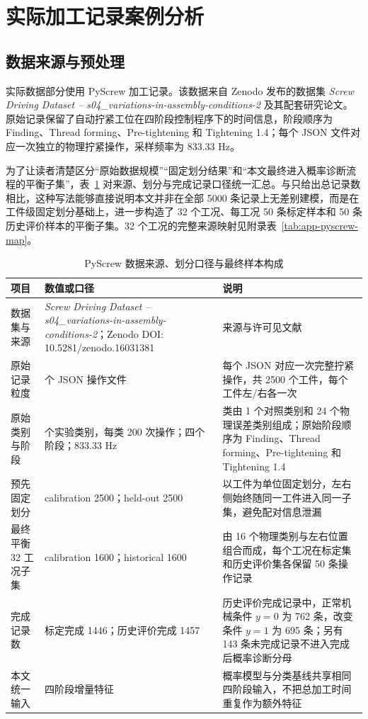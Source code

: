 \documentclass[master,fontset=ubuntu]{shnuthesis}
\theoremstyle{definition}
\begin{document}
\section{实际加工记录案例分析}

\subsection{数据来源与预处理}

实际数据部分使用 PyScrew 加工记录。该数据来自 Zenodo 发布的数据集 \textit{Screw Driving Dataset -- s04\_variations-in-assembly-conditions-2} 及其配套研究论文\cite{WestDeuse2025PyScrewDataset,WestDeuse2024HICSS}。原始记录保留了自动拧紧工位在四阶段控制程序下的时间信息，阶段顺序为 Finding、Thread forming、Pre-tightening 和 Tightening 1.4；每个 JSON 文件对应一次独立的物理拧紧操作，采样频率为 833.33 Hz。

为了让读者清楚区分“原始数据规模”“固定划分结果”和“本文最终进入概率诊断流程的平衡子集”，表~\ref{tab:chap6-pyscrew-data} 对来源、划分与完成记录口径统一汇总。与只给出总记录数相比，这种写法能够直接说明本文并非在全部 5000 条记录上无差别建模，而是在工件级固定划分基础上，进一步构造了 32 个工况、每工况 50 条标定样本和 50 条历史评价样本的平衡子集。32 个工况的完整来源映射见附录表~\ref{tab:app-pyscrew-map}。

\begin{table}[htbp]
\centering
\caption{PyScrew 数据来源、划分口径与最终样本构成}
\label{tab:chap6-pyscrew-data}
\renewcommand{\arraystretch}{1.18}
\small
\setlength{\tabcolsep}{5pt}
\begin{tabularx}{\textwidth}{>{\raggedright\arraybackslash}p{2.45cm}>{\raggedright\arraybackslash}p{4.65cm}>{\raggedright\arraybackslash}X}
\hline
项目 & 数值或口径 & 说明\\
\hline
数据集与来源 & \textit{Screw Driving Dataset -- s04\_variations-in-assembly-conditions-2}；Zenodo DOI: 10.5281/zenodo.16031381 & 来源与许可见文献\cite{WestDeuse2025PyScrewDataset,WestDeuse2024HICSS}\\
原始记录粒度 & 5000 个 JSON 操作文件 & 每个 JSON 对应一次完整拧紧操作，共 2500 个工件，每个工件左/右各一次\\
原始类别与阶段 & 25 个实验类别，每类 200 次操作；四个阶段；833.33 Hz & 25 类由 1 个对照类别和 24 个物理误差类别组成；原始阶段顺序为 Finding、Thread forming、Pre-tightening 和 Tightening 1.4\\
预先固定划分 & calibration 2500；held-out 2500 & 以工件为单位固定划分，左右侧始终随同一工件进入同一子集，避免配对信息泄漏\\
最终平衡 32 工况子集 & calibration 1600；historical 1600 & 由 16 个物理类别与左右位置组合而成，每个工况在标定集和历史评价集各保留 50 条操作记录\\
完成记录数 & 标定完成 1446；历史评价完成 1457 & 历史评价完成记录中，正常机械条件 $y=0$ 为 762 条，改变条件 $y=1$ 为 695 条；另有 143 条未完成记录不进入完成后概率诊断分母\\
本文统一输入 & 四阶段增量特征 & 概率模型与分类基线共享相同四阶段输入，不把总加工时间重复作为额外特征\\
\hline
\end{tabularx}
\normalsize
\end{table}
\end{document}
